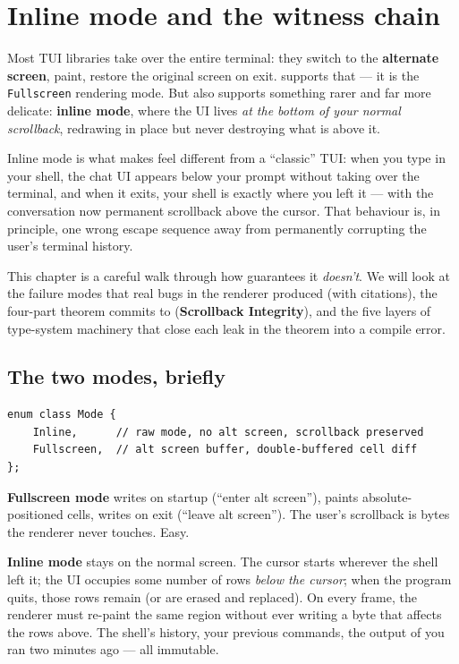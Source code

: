 \chapter{Inline mode and the witness chain}
\label{ch:inline}

Most TUI libraries take over the entire terminal: they switch to the
\textbf{alternate screen}, paint, restore the original screen on
exit. \maya{} supports that --- it is the \texttt{Fullscreen}
rendering mode. But \maya{} also supports something rarer and far
more delicate: \textbf{inline mode}, where the UI lives \emph{at the
bottom of your normal scrollback}, redrawing in place but never
destroying what is above it.

Inline mode is what makes \agentty{} feel different from a
``classic'' TUI: when you type  in your shell, the chat
UI appears below your prompt without taking over the terminal, and
when it exits, your shell is exactly where you left it --- with the
conversation now permanent scrollback above the cursor. That
behaviour is, in principle, one wrong escape sequence away from
permanently corrupting the user's terminal history.

This chapter is a careful walk through how \maya{} guarantees it
\emph{doesn't}. We will look at the failure modes that real bugs in
the renderer produced (with citations), the four-part theorem
\maya{} commits to (\textbf{Scrollback Integrity}), and the five
layers of type-system machinery that close each leak in the theorem
into a compile error.

\section{The two modes, briefly}

\begin{lstlisting}
enum class Mode {
    Inline,      // raw mode, no alt screen, scrollback preserved
    Fullscreen,  // alt screen buffer, double-buffered cell diff
};
\end{lstlisting}

\textbf{Fullscreen mode} writes \code{ESC[?1049h} on startup
(``enter alt screen''), paints absolute-positioned cells, writes
\code{ESC[?1049l} on exit (``leave alt screen''). The user's
scrollback is bytes the renderer never touches. Easy.

\textbf{Inline mode} stays on the normal screen. The cursor starts
wherever the shell left it; the UI occupies some number of rows
\emph{below the cursor}; when the program quits, those rows remain
(or are erased and replaced). On every frame, the renderer must
re-paint the same region without ever writing a byte that affects
the rows above. The shell's history, your previous commands, the
output of  you ran two minutes ago --- all immutable.

